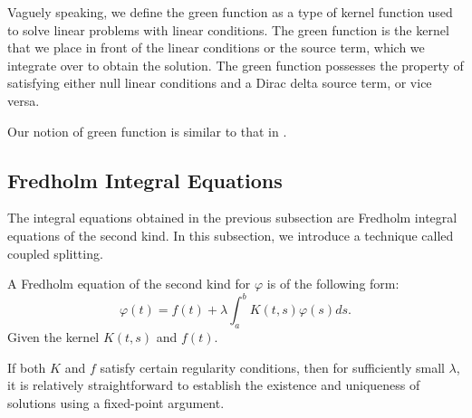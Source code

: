 \documentclass[a4paper,12pt]{article}
\begin{document}
\begin{definition}
    Vaguely speaking, we define the green function as a type
    of kernel function used to solve linear problems with linear
    conditions. The green function is the kernel that we
    place in front of the linear conditions or the source term,
    which we integrate over to obtain the solution. The green
    function possesses the property of satisfying either null
    linear conditions and a Dirac delta source term, or vice versa.
\end{definition}

\begin{related}
    Our notion of green function is similar to that in \cite{hwang_simulationtabulation_2001}.
\end{related}


\subsection{Fredholm Integral Equations}

The integral equations obtained in the previous subsection are Fredholm integral
equations of the second kind. In this subsection, we introduce a technique called
coupled splitting.


\begin{definition}
    A Fredholm equation of the second kind for $\varphi$  is of the following form:
    \begin{equation}
        \varphi(t)=f(t)+\lambda \int_a^b K(t, s) \varphi(s) ds.
    \end{equation}
    Given the kernel  $K(t, s)$  and  $ f(t)$.
\end{definition}

If both $K$ and $f$ satisfy certain regularity conditions, then for sufficiently
small $\lambda$, it is relatively straightforward to establish the existence
and uniqueness of solutions using a fixed-point argument.

\end{document}
